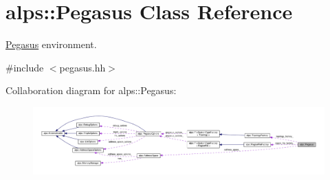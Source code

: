 \hypertarget{classalps_1_1Pegasus}{}\section{alps\+:\+:Pegasus Class Reference}
\label{classalps_1_1Pegasus}


\hyperlink{classalps_1_1Pegasus}{Pegasus} environment.  




{\ttfamily \#include $<$pegasus.\+hh$>$}



Collaboration diagram for alps\+:\+:Pegasus\+:
\nopagebreak
\begin{figure}[H]
\begin{center}
\leavevmode
\includegraphics[width=350pt]{classalps_1_1Pegasus__coll__graph}
\end{center}
\end{figure}
